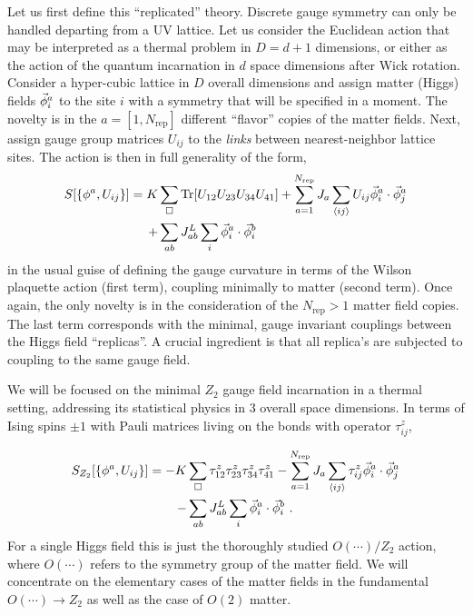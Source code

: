 Let us first define this ``replicated'' theory. Discrete gauge symmetry can only be handled departing from a UV lattice. Let us consider the Euclidean action that may be interpreted as a thermal problem in $D = d + 1$ dimensions, or either as the action of the quantum incarnation in $d$ space dimensions after Wick rotation. Consider a hyper-cubic lattice in $D$ overall dimensions and assign matter (Higgs) fields $\va{\phi}_i^a$  to the site $i$ with a symmetry that will be specified in a moment. The novelty is in the $a = [1,N_{\text{rep}}]$ different ``flavor'' copies of the matter fields. Next, assign gauge group matrices $U_{ij}$ to the \textit{links} between nearest-neighbor lattice sites. The action is then in full generality of the form,
\begin{equation}
	\begin{split}
	S[\{\phi^a,U_{ij}\}] = K &\sum_{\square} \Tr [U_{12}U_{23}U_{34}U_{41}] + \sum_{a=1}^{N_{\text{rep}}} J_a \sum_{\langle ij \rangle} U_{ij} \va{\phi}_i^a \cdot \va{\phi}_j^a \\ + &\sum_{ab} J^L_{ab} \sum_i \va{\phi}_i^a \cdot \va{\phi}_i^b
\end{split}
\end{equation}
in the usual guise of defining the gauge curvature in terms of the Wilson plaquette action (first term), coupling minimally to matter (second term). Once again, the only novelty is in the consideration of the $N_{\text{rep}}>1$ matter field copies. The last term corresponds with the minimal, gauge invariant couplings between the Higgs field ``replicas''. A crucial ingredient is that all replica’s are subjected to coupling to the same gauge field.

We will be focused on the minimal $Z_2$ gauge field incarnation in a thermal setting, addressing its statistical physics in 3 overall space dimensions. In terms of Ising spins $\pm 1$ with Pauli matrices  living on the bonds with operator $\tau_{ij}^z$,

\begin{equation}
	\label{eq:z2action}
	\begin{split}
		S_{Z_2}[\{\phi^a,U_{ij}\}] = -K&\sum_{\square}\tau^z_{12}\tau^z_{23}\tau^z_{34}\tau^z_{41} - \sum_{a=1}^{N_{\text{rep}}}J_a\sum_{\langle ij \rangle}\tau^z_{ij} \va{\phi}_i^a \cdot \va{\phi}_j^a \\ - &\sum_{ab}J^L_{ab}\sum_i \va{\phi}_i^a \cdot \va{\phi}_i^b \ .
	\end{split}
\end{equation}
For a single Higgs field this is just the thoroughly studied $O(\cdots)/Z_2$ action, where $O(\cdots)$ refers to the symmetry group of the matter field. We will concentrate on the elementary cases of the matter fields in the fundamental $O(\cdots) \rightarrow Z_2$ as well as the case of $O(2)$ matter.  

